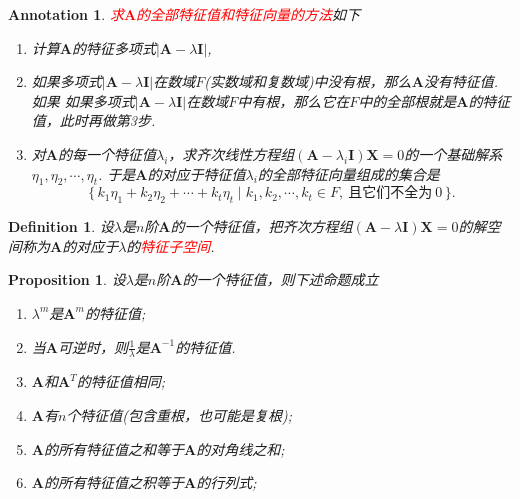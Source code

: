 \documentclass{article}
\newtheorem{proposition}[theorem]{Proposition}
\newtheorem{definition}[theorem]{Definition}
\newtheorem{annotation}[theorem]{Annotation}
\newcommand\Set[2]{\{\,#1\mid#2\,\}} %
\newcommand{\mbf}[1]{\bm{#1}}
\newcommand{\redt}[1]{\textcolor{red}{#1}}
\begin{document}
\begin{annotation}
\rm \redt{求$\mbf{A}$的全部特征值和特征向量的方法}如下
\begin{enumerate}
	\item 计算$\mbf{A}$的特征多项式$|\mbf{A}-\lambda\mbf{I}|$,
	\item 如果多项式$|\mbf{A}-\lambda\mbf{I}|$在数域$F$(实数域和复数域)中没有根，那么$\mbf{A}$没有特征值. 如果 如果多项式$|\mbf{A}-\lambda\mbf{I}|$在数域$F$中有根，那么它在$F$中的全部根就是$\mbf{A}$的特征值，此时再做第3步.
	\item 对$\mbf{A}$的每一个特征值$\lambda_i$，求齐次线性方程组$(\mbf{A}-\lambda_i\mbf{I})\mbf{X} = 0$的一个基础解系$\eta_1,\eta_2,\cdots,\eta_t$. 于是$\mbf{A}$的对应于特征值$\lambda_i$的全部特征向量组成的集合是
$$
\Set{k_1\eta_1 + k_2\eta_2 + \cdots + k_t\eta_t}{k_1,k_2,\cdots,k_t \in F, ~\text{且它们不全为}~0}.
$$
\end{enumerate}
\end{annotation}

\begin{definition}
\rm 设$\lambda$是$n$阶$\mbf{A}$的一个特征值，把齐次方程组$(\mbf{A}-\lambda\mbf{I})\mbf{X} = 0$的解空间称为$\mbf{A}$的对应于$\lambda$的\redt{特征子空间}.
\end{definition}

\begin{proposition}
\rm 设$\lambda$是$n$阶$\mbf{A}$的一个特征值，则下述命题成立
\begin{enumerate}
	\item $\lambda^m$是$\mbf{A}^m$的特征值;
	\item 当$\mbf{A}$可逆时，则$\frac{1}{\lambda}$是$\mbf{A}^{-1}$的特征值.
	\item $\mbf{A}$和$\mbf{A}^T$的特征值相同;
	\item $\mbf{A}$有$n$个特征值(包含重根，也可能是复根);
	\item $\mbf{A}$的所有特征值之和等于$\mbf{A}$的对角线之和;
	\item $\mbf{A}$的所有特征值之积等于$\mbf{A}$的行列式;
\end{enumerate}
\end{proposition}
\end{document}
